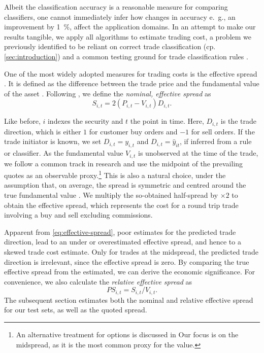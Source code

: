 Albeit the classification accuracy is a reasonable measure for comparing classifiers, one cannot immediately infer how changes in accuracy e.~g., an improvement by \SI{1}{\percent}, affect the application domains. In an attempt to make our results tangible, we apply all algorithms to estimate trading cost, a problem we previously identified to be reliant on correct trade classification (cp. \cref{sec:introduction}) and a common testing ground for trade classification rules \autocites[cp.][541]{ellisAccuracyTradeClassification2000}[][569]{finucaneDirectTestMethods2000}[][271--278]{petersonEvaluationBiasesExecution2003}[][896--897]{savickasInferringDirectionOption2003}.

One of the most widely adopted measures for trading costs is the effective spread \autocite[][112]{Piwowar_2006}. It is defined as the difference between the trade price and the fundamental value of the asset \autocite[][238--239]{bessembinderIssuesAssessingTrade2003}. Following \textcite[][238--239]{bessembinderIssuesAssessingTrade2003}, we define the \emph{nominal, effective spread} as
\begin{equation}
    S_{i,t} = 2 (P_{i,t} - V_{i,t}) D_{i,t}.
    \label{eq:effective-spread}
\end{equation}

Like before, $i$ indexes the security and $t$ the point in time. Here, $D_{i,t}$ is the trade direction, which is either $1$ for customer buy orders and $-1$ for sell orders. If the trade initiator is known, we set $D_{i,t} = y_{i,t}$ and $D_{i,t}=\hat{y}_{it}$, if inferred from a rule or classifier. As the fundamental value $V_{i,t}$ is unobserved at the time of the trade, we follow a common track in research and use the midpoint of the prevailing quotes as an observable proxy.\footnote{An alternative treatment for options is discussed in \textcite[][4975--4976]{muravyevOptionsTradingCosts2020} Our focus is on the midspread, as it is the most common proxy for the value.} This is also a natural choice, under the assumption that, on average, the spread is symmetric and centred around the true fundamental value \autocite[][1018]{leeMarketIntegrationPrice1993}. We multiply the so-obtained half-spread by $\times 2$ to obtain the effective spread, which represents the cost for a round trip trade involving a buy and sell excluding commissions.

Apparent from \cref{eq:effective-spread}, poor estimates for the predicted trade direction, lead to an under or overestimated effective spread, and hence to a skewed trade cost estimate. Only for trades at the midspread, the predicted trade direction is irrelevant, since the effective spread is zero. By comparing the true effective spread from the estimated, we can derive the economic significance. For convenience, we also calculate the \emph{relative effective spread} as
\begin{equation}
    {PS}_{i,t} = S_{i,t} / V_{i,t}.
\end{equation}
The subsequent section estimates both the nominal and relative effective spread for our test sets, as well as the quoted spread.

